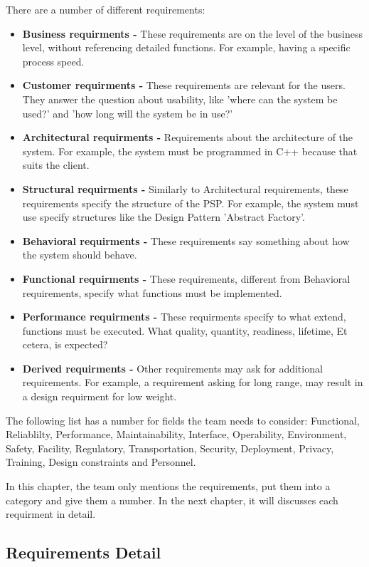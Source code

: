 \documentclass[10pt]{report}
\begin{document}
\noindent There are a number of different requirements:

\begin{itemize}
	\item \textbf{Business requirments -} These requirements are on the level of the business level, without referencing detailed functions. For example, having a specific process speed.
	\item \textbf{Customer requirments -} These requirements are relevant for the users. They answer the question about usability, like 'where can the system be used?' and 'how long will the system be in use?'
	\item \textbf{Architectural requirments -} Requirements about the architecture of the system. For example, the system must be programmed in C++ because that suits the client.
	\item \textbf{Structural requirments -} Similarly to Architectural requirements, these requirements specify the structure of the PSP. For example, the system must use specify structures like the Design Pattern 'Abstract Factory'.
	\item \textbf{Behavioral requirments -} These requirements say something about how the system should behave.
	\item \textbf{Functional requirments -} These requirements, different from Behavioral requirements, specify what functions must be implemented.
	\item \textbf{Performance requirments -} These requirments specify to what extend, functions must be executed. What quality, quantity, readiness, lifetime, Et cetera, is expected?
	\item \textbf{Derived requirments -} Other requirements may ask for additional requirements. For example, a requirement asking for long range, may result in a design requirment for low weight.
\end{itemize}

\noindent The following list has a number for fields the team needs to consider: Functional, Reliablilty, Performance, Maintainability, Interface, Operability, Environment, Safety, Facility, Regulatory, Transportation, Security, Deployment, Privacy, Training, Design constraints and Personnel.

In this chapter, the team only mentions the requirements, put them into a category and give them a number. In the next chapter, it will discusses each requirment in detail.

\subsection{Requirements Detail}
\end{document}
